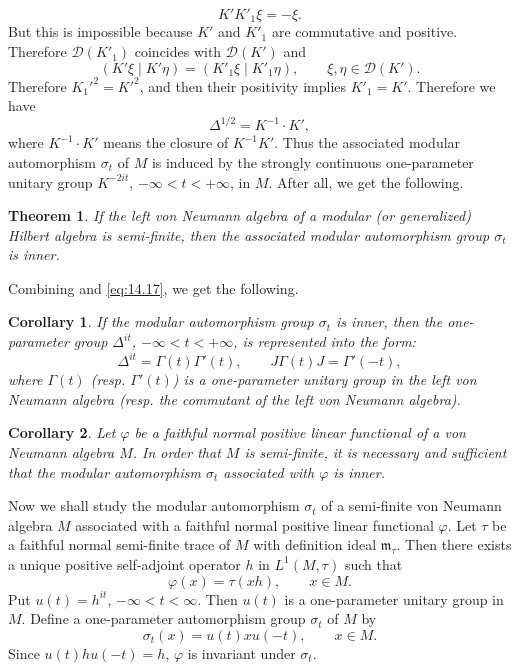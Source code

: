 \documentclass[12pt,b5paper,twoside]{article}
\theoremstyle{takesaki}
\newtheorem{theorem}{Theorem}[section]
\newtheorem{corollary}{Corollary}[section]
\numberwithin{equation}{section}
\begin{document}
\[
 K'K'_1\xi=-\xi.
\]
But this is impossible because $K'$ and $K'_1$ are commutative and
positive.  Therefore $\mathcal D(K'_1)$ coincides with
$\mathcal D(K')$ and
\[
 (K'\xi\mid K'\eta)=(K'_1\xi\mid K'_1\eta),
 \qquad \xi,\eta\in\mathcal D(K').
\]
Therefore $K_1'^2=K'^2$, and then their positivity implies
$K'_1=K'$.  Therefore we have
\begin{equation}
 \Delta^{1/2}=K^{-1}\mathbin{\cdot}K',
 \tag{14.17}\label{eq:14.17}
\end{equation}
where $K^{-1}\mathbin{\cdot}K'$ means the closure of $K^{-1}K'$.
Thus the associated modular automorphism $\sigma_t$ of $M$ is induced
by the strongly continuous one-parameter unitary group $K^{-2it}$,
$-\infty<t<+\infty$, in $M$.  After all, we get the following.

\begin{theorem}\label{thm:14.2}
If the left von Neumann algebra of a modular (or generalized) Hilbert
algebra is semi-finite, then the associated modular automorphism group
$\sigma_t$ is inner.
\end{theorem}

Combining  and \eqref{eq:14.17}, we get the
following.

\begin{corollary}\label{cor:14.1}
If the modular automorphism group $\sigma_t$ is inner, then the
one-parameter group $\Delta^{it}$, $-\infty<t<+\infty$, is represented
into the form:
\begin{equation}
 \Delta^{it}=\Gamma(t)\Gamma'(t),
 \qquad J\Gamma(t)J=\Gamma'(-t),
 \tag{14.18}\label{eq:14.18}
\end{equation}
where $\Gamma(t)$ (resp. $\Gamma'(t)$) is a one-parameter unitary
group in the left von Neumann algebra (resp. the commutant of the left
von Neumann algebra).
\end{corollary}

\begin{corollary}\label{cor:14.2}
Let $\varphi$ be a faithful normal positive linear functional of a von
Neumann algebra $M$.  In order that $M$ is semi-finite, it is necessary
and sufficient that the modular automorphism $\sigma_t$ associated
with $\varphi$ is inner.
\end{corollary}

Now we shall study the modular automorphism $\sigma_t$ of a semi-finite
von Neumann algebra $M$ associated with a faithful normal positive
linear functional $\varphi$.  Let $\tau$ be a faithful normal
semi-finite trace of $M$ with definition ideal $\mathfrak m_\tau$.
Then there exists a unique positive self-adjoint operator $h$ in
$L^1(M,\tau)$ such that
\begin{equation}
 \varphi(x)=\tau(xh),
 \qquad x\in M.
 \tag{14.19}\label{eq:14.19}
\end{equation}
Put $u(t)=h^{it}$, $-\infty<t<\infty$.  Then $u(t)$ is a
one-parameter unitary group in $M$.  Define a one-parameter
automorphism group $\sigma_t$ of $M$ by
\begin{equation}
 \sigma_t(x)=u(t)xu(-t),
 \qquad x\in M.
 \tag{14.20}\label{eq:14.20}
\end{equation}
Since $u(t)hu(-t)=h$, $\varphi$ is invariant under $\sigma_t$.
\end{document}
